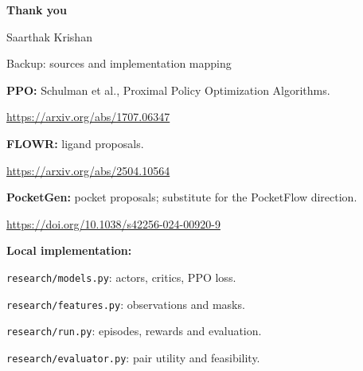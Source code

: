 \documentclass[aspectratio=169,11pt]{beamer}
\begin{document}
\begin{frame}[plain]
\vfill{\bfseries\fontsize{28}{34}\selectfont Thank you\par}
\vspace{4mm}{\color{teal}\rule{24mm}{1pt}\par}
\vspace{4mm}Saarthak Krishan\vfill
\end{frame}
\appendix
\begin{frame}{Backup: sources and implementation mapping}

\small
\textbf{PPO:} Schulman et al., Proximal Policy Optimization Algorithms.\par
\url{https://arxiv.org/abs/1707.06347}\par\vspace{3mm}
\textbf{FLOWR:} ligand proposals.\par
\url{https://arxiv.org/abs/2504.10564}\par\vspace{3mm}
\textbf{PocketGen:} pocket proposals; substitute for the PocketFlow direction.\par
\url{https://doi.org/10.1038/s42256-024-00920-9}\par\vspace{3mm}
\textbf{Local implementation:}\par
\texttt{research/models.py}: actors, critics, PPO loss.\par
\texttt{research/features.py}: observations and masks.\par
\texttt{research/run.py}: episodes, rewards and evaluation.\par
\texttt{research/evaluator.py}: pair utility and feasibility.

\end{frame}
\end{document}
